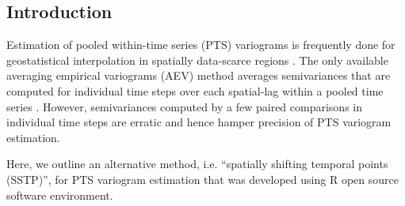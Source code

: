 \documentclass[a0,portrait]{a0poster}
\begin{document}
\begin{multicols}{2} %







\color{SaddleBrown} %

\section*{Introduction}

Estimation of pooled within-time series (PTS) variograms is frequently done for geostatistical interpolation in spatially data-scarce regions \cite{wagner_comparison_2012}. The only available averaging empirical variograms (AEV) method averages semivariances that are computed for individual time steps over each spatial-lag within a pooled time series \cite{graler_spatio-temporal_2011}. However, semivariances computed by a few paired comparisons in individual time steps are erratic and hence hamper precision of PTS variogram estimation.

Here, we outline an alternative method, i.e. ``spatially shifting temporal points (SSTP)'', for PTS variogram estimation that was developed using R open source software environment.


\end{multicols}
\end{document}
